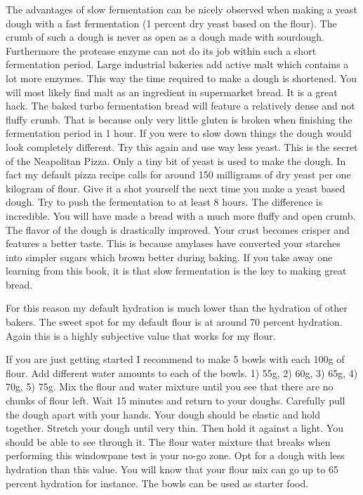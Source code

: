 The advantages of slow fermentation can be nicely observed when making a yeast
dough with a fast fermentation (1 percent dry yeast based on the flour). The
crumb of such a dough is never as
open as a dough made with sourdough. Furthermore the protease enzyme
can not do its job within such a short fermentation period.
Large industrial bakeries add active malt which contains a
lot more enzymes. This way the time required to make a dough is shortened. You
will most likely find malt as an ingredient in supermarket bread. It is a
great hack. The baked turbo fermentation bread will feature a relatively dense
and not fluffy crumb. That is because only very little gluten is broken when
finishing the fermentation period in 1 hour. If you were to slow down things
the dough would look completely different.
Try this again and use way less yeast. This is the
secret of the Neapolitan Pizza. Only a tiny bit of yeast is used to make the
dough. In fact my default pizza recipe calls for around 150 milligrams of dry
yeast per one kilogram of flour. Give it a shot yourself the next time you
make a yeast based dough. Try to push the fermentation to at least 8 hours.
The difference is incredible. You will have made a bread with a much more
fluffy and open crumb. The flavor of the dough is drastically improved. Your
crust becomes crisper and features a better taste. This is because amylases have
converted your starches into simpler sugars which brown better during baking.
If you take away one learning from this book, it is that slow fermentation is
the key to making great bread.

For this reason my default hydration is much lower than the hydration of other
bakers. The sweet spot for my default flour is at around 70 percent hydration.
Again this is a highly subjective value that works for my flour.

If you are just getting started I recommend to make 5 bowls with each 100g of
flour. Add different water amounts to each of the bowls. 1) 55g, 2) 60g, 3)
65g, 4) 70g, 5) 75g. Mix the flour and water mixture until you see that there
are no chunks of flour left. Wait 15 minutes and return to your doughs.
Carefully pull the dough apart with your hands. Your dough should be elastic
and hold together. Stretch your dough until very thin. Then hold it against a light.
You should be able to see through it. The flour water mixture that breaks
when performing this windowpane test is your no-go zone. Opt for a dough with
less hydration than this value. You will know that your flour mix can go up to
65 percent hydration for instance. The bowls can be used as starter food.

